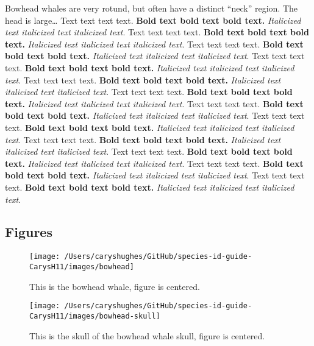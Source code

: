 \documentclass[
]{article}
\begin{document}
Bowhead whales are very rotund, but often have a distinct ``neck''
region. The head is large\ldots{} Text text text text. \textbf{Bold text
bold text bold text.} \emph{Italicized text italicized text italicized
text}. Text text text text. \textbf{Bold text bold text bold text.}
\emph{Italicized text italicized text italicized text}. Text text text
text. \textbf{Bold text bold text bold text.} \emph{Italicized text
italicized text italicized text}. Text text text text. \textbf{Bold text
bold text bold text.} \emph{Italicized text italicized text italicized
text}. Text text text text. \textbf{Bold text bold text bold text.}
\emph{Italicized text italicized text italicized text}. Text text text
text. \textbf{Bold text bold text bold text.} \emph{Italicized text
italicized text italicized text}. Text text text text. \textbf{Bold text
bold text bold text.} \emph{Italicized text italicized text italicized
text}. Text text text text. \textbf{Bold text bold text bold text.}
\emph{Italicized text italicized text italicized text}. Text text text
text. \textbf{Bold text bold text bold text.} \emph{Italicized text
italicized text italicized text}. Text text text text. \textbf{Bold text
bold text bold text.} \emph{Italicized text italicized text italicized
text}. Text text text text. \textbf{Bold text bold text bold text.}
\emph{Italicized text italicized text italicized text}. Text text text
text. \textbf{Bold text bold text bold text.} \emph{Italicized text
italicized text italicized text}.

\newpage

\hypertarget{figures-1}{%
\subsection{Figures}\label{figures-1}}

\begin{figure}
\texttt{[image: /Users/caryshughes/GitHub/species-id-guide-CarysH11/images/bowhead]} \caption{This is the bowhead whale, figure is centered.}\label{fig:bowhead-whale}
\end{figure}

\begin{figure}
\texttt{[image: /Users/caryshughes/GitHub/species-id-guide-CarysH11/images/bowhead-skull]} \caption{This is the skull of the bowhead whale skull, figure is centered.}\label{fig:bowhead-whale-skull}
\end{figure}
\end{document}
